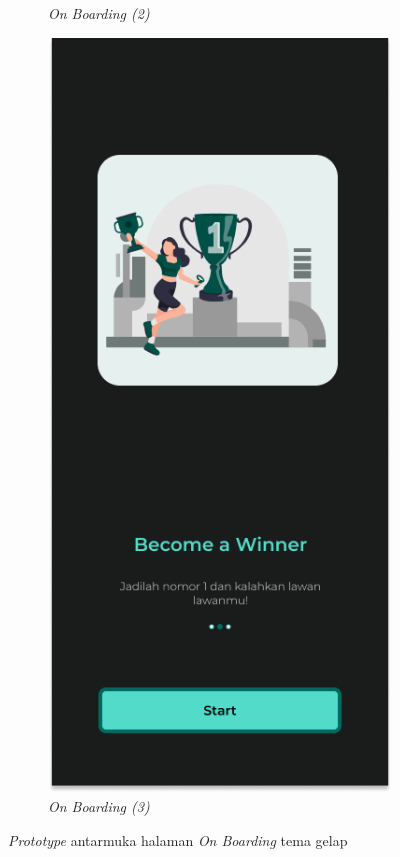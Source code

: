 \begin{figure}[H]
\begin{subfigure}[b]{0.25\textwidth}
	  \caption{\textit{On Boarding (2)}}
	  \label{fig:HasilBoarding2-dt}
	\end{subfigure}
	\begin{subfigure}[b]{0.25\textwidth}
		\centering
	  \includegraphics[width=\linewidth]{contents/chapter-3/images/HF-Boarding-3-dt.png}
	  \caption{\textit{On Boarding (3)}}
	  \label{fig:HasilBoarding3-dt}
	\end{subfigure}
	\caption{\textit{Prototype} antarmuka halaman \textit{On Boarding} tema gelap}
	\label{Fig:HasilFeatureSetBoarding-dt}
\end{figure}
